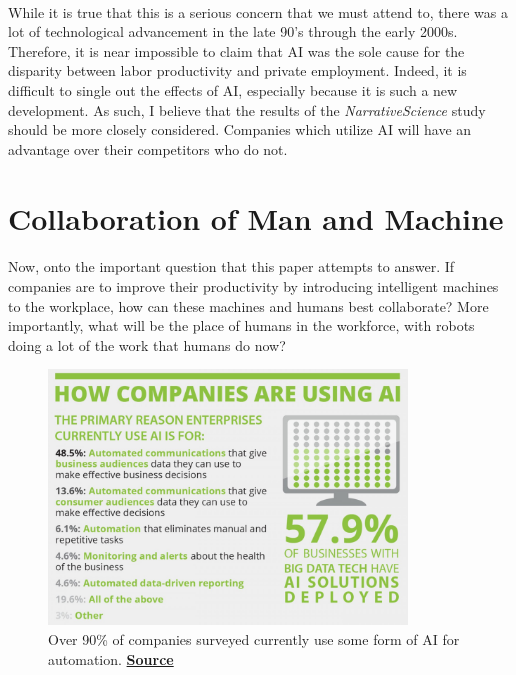 \documentclass{article}
\begin{document}
    \paragraph{}
      While it is true that this is a serious concern that we must attend to,
      there was a lot of technological advancement in the late 90’s through
      the early 2000s. Therefore, it is near impossible to claim that AI was
      the sole cause for the disparity between labor productivity and private
      employment. Indeed, it is difficult to single out the effects of AI,
      especially because it is such a new development. As such, I believe that
      the results of the \textit{NarrativeScience} study should be more closely
      considered. Companies which utilize AI will have an advantage
      over their competitors who do not.

  \section{Collaboration of Man and Machine}

    \paragraph{}
      Now, onto the important question that this paper attempts to answer.
      If companies are to improve their productivity by introducing intelligent
      machines to the workplace, how can these machines
       and humans best collaborate? More importantly, what will be the place
      of humans in the workforce, with robots doing a lot of the work that humans
      do now?

      \begin{figure}[h]
        \centering
        \captionsetup{width=.85\linewidth}
        \includegraphics[width=0.85\textwidth,height=\textheight, keepaspectratio]{Figure3}
        \caption{Over 90\% of companies surveyed currently use some form of AI for automation.
                 \href{http://thumbnails-visually.netdna-ssl.com/artificial-intelligence-is-not-killing-jobs_557b4376e27b8_w1500.jpg}
                 {\textbf{Source}}}
      \end{figure}
\end{document}
